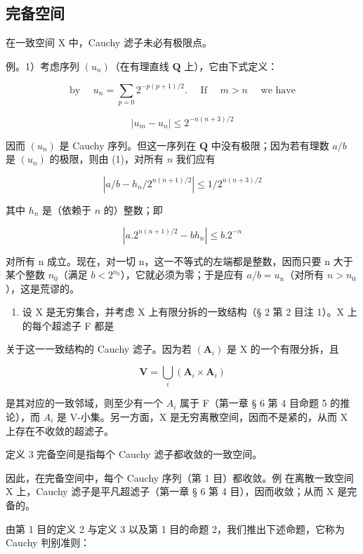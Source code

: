 \subsection{完备空间}

在一致空间 X 中，Cauchy 滤子未必有极限点。

例。1）考虑序列 \((u_{n})\)（在有理直线 \(\mathbf{Q}\) 上），它由下式定义：

\[
\text { by } \quad u _ {n} = \sum_ {p = 0} 2 ^ {- p (p + 1) / 2}. \quad \text { If } \quad m > n \quad \text { we   have }\tag{1}
\]

\[
\left| u _ {m} - u _ {n} \right| \leqslant 2 ^ {- n (n + 3) / 2}
\]

因而 \((u_{n})\) 是 Cauchy 序列。但这一序列在 \(\mathbf{Q}\) 中没有极限；因为若有理数 \(a / b\) 是 \((u_{n})\) 的极限，则由 (1)，对所有 \(n\) 我们应有

\[
\left| a / b - h _ {n} / 2 ^ {n (n + 1) / 2} \right| \leqslant 1 / 2 ^ {n (n + 3) / 2}
\]

其中 \(h_n\) 是（依赖于 \(n\) 的）整数；即

\[
\left| a. 2 ^ {n (n + 1) / 2} - b h _ {n} \right| \leqslant b. 2 ^ {- n}
\]

对所有 n 成立。现在，对一切 n，这一不等式的左端都是整数，因而只要 n 大于某个整数 \(n_{0}\)（满足 \(b < 2^{n_{0}}\)），它就必须为零；于是应有 \(a/b = u_{n}\)（对所有 \(n > n_{0}\)），这是荒谬的。

\begin{enumerate}
\def\labelenumi{\arabic{enumi})}
\setcounter{enumi}{1}
\tightlist
\item
  设 X 是无穷集合，并考虑 X 上有限分拆的一致结构（§ 2 第 2 目注 1）。X 上的每个超滤子 F 都是
\end{enumerate}

关于这一一致结构的 Cauchy 滤子。因为若 \((\mathbf{A}_{i})\) 是 X 的一个有限分拆，且

\[
\mathbf {V} = \bigcup_ {i} (\mathbf {A} _ {i} \times \mathbf {A} _ {i})
\]

是其对应的一致邻域，则至少有一个 \(A_{i}\) 属于 F（第一章 § 6 第 4 目命题 5 的推论），而 \(A_{i}\) 是 V-小集。另一方面，X 是无穷离散空间，因而不是紧的，从而 X 上存在不收敛的超滤子。

定义 3 完备空间是指每个 Cauchy 滤子都收敛的一致空间。

因此，在完备空间中，每个 Cauchy 序列（第 1 目）都收敛。例 在离散一致空间 X 上，Cauchy 滤子是平凡超滤子（第一章 § 6 第 4 目），因而收敛；从而 X 是完备的。

由第 1 目的定义 2 与定义 3 以及第 1 目的命题 2，我们推出下述命题，它称为 Cauchy 判别准则：

